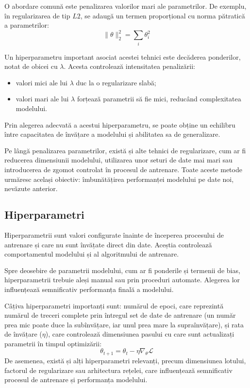 O abordare comună este penalizarea valorilor mari ale parametrilor. De exemplu, în regularizarea de tip \(L2\), se adaugă un termen proporțional cu norma pătratică a parametrilor:
\[
    \|\theta\|_2^2 = \sum_{i} \theta_i^2
\]

Un hiperparametru important asociat acestei tehnici este decăderea ponderilor, notat de obicei cu \( \lambda \). Acesta controlează intensitatea penalizării:
\begin{itemize}
    \item valori mici ale lui \( \lambda \) duc la o regularizare slabă;
    \item valori mari ale lui \( \lambda \) forțează parametrii să fie mici, reducând complexitatea modelului.
\end{itemize}

Prin alegerea adecvată a acestui hiperparametru, se poate obține un echilibru între capacitatea de învățare a modelului și abilitatea sa de generalizare.

Pe lângă penalizarea parametrilor, există și alte tehnici de regularizare, cum ar fi reducerea dimensiunii modelului, utilizarea unor seturi de date mai mari sau introducerea de zgomot controlat în procesul de antrenare. Toate aceste metode urmăresc același obiectiv: îmbunătățirea performanței modelului pe date noi, nevăzute anterior.

\subsection*{Hiperparametri}

Hiperparametrii sunt valori configurate înainte de începerea procesului de antrenare și care nu sunt învățate direct din date. Aceștia controlează comportamentul modelului și al algoritmului de antrenare.

Spre deosebire de parametrii modelului, cum ar fi ponderile și termenii de bias, hiperparametrii trebuie aleși manual sau prin proceduri automate. Alegerea lor influențează semnificativ performanța finală a modelului.

Câțiva hiperparametri importanți sunt: numărul de epoci, care reprezintă numărul de treceri complete prin întregul set de date de antrenare (un număr prea mic poate duce la subînvățare, iar unul prea mare la supraînvățare), și rata de învățare (\( \eta \)), care controlează dimensiunea pasului cu care sunt actualizați parametrii în timpul optimizării:
\[
\theta_{t+1} = \theta_t - \eta \nabla_\theta \mathcal{L}
\]
De asemenea, există și alți hiperparametri relevanți, precum dimensiunea lotului, factorul de regularizare sau arhitectura rețelei, care influențează semnificativ procesul de antrenare și performanța modelului.

